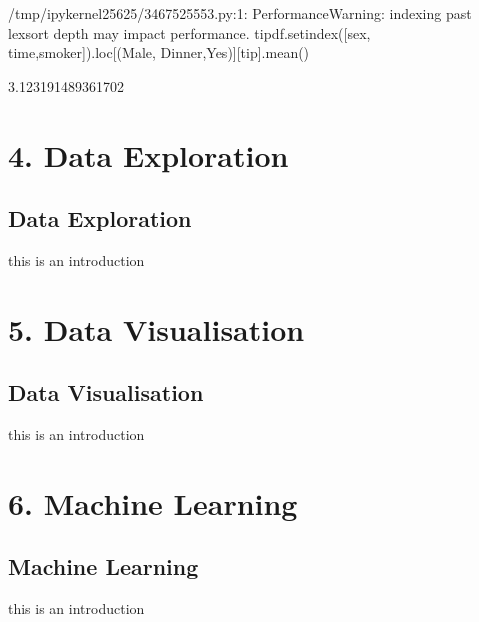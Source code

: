 \documentclass[letterpaper,10pt,english]{jupyterBook}
\begin{document}
\begin{sphinxVerbatim}[commandchars=\\\{\}]
/tmp/ipykernel\PYGZus{}25625/3467525553.py:1: PerformanceWarning: indexing past lexsort depth may impact performance.
  tip\PYGZus{}df.set\PYGZus{}index([\PYGZsq{}sex\PYGZsq{}, \PYGZsq{}time\PYGZsq{},\PYGZsq{}smoker\PYGZsq{}]).loc[(\PYGZsq{}Male\PYGZsq{}, \PYGZsq{}Dinner\PYGZsq{},\PYGZsq{}Yes\PYGZsq{})][\PYGZsq{}tip\PYGZsq{}].mean()
\end{sphinxVerbatim}

\begin{sphinxVerbatim}[commandchars=\\\{\}]
3.123191489361702
\end{sphinxVerbatim}


\part{4. Data Exploration}


\chapter{Data Exploration}
\label{\detokenize{c4_data_exploration/introduction:data-exploration}}\label{\detokenize{c4_data_exploration/introduction::doc}}
\sphinxAtStartPar
this is an introduction


\part{5. Data Visualisation}


\chapter{Data Visualisation}
\label{\detokenize{c5_data_visualisation/introduction:data-visualisation}}\label{\detokenize{c5_data_visualisation/introduction::doc}}
\sphinxAtStartPar
this is an introduction


\part{6. Machine Learning}


\chapter{Machine Learning}
\label{\detokenize{c6_machine_learning/introduction:machine-learning}}\label{\detokenize{c6_machine_learning/introduction::doc}}
\sphinxAtStartPar
this is an introduction







\renewcommand{\indexname}{Index}
\printindex
\end{document}
